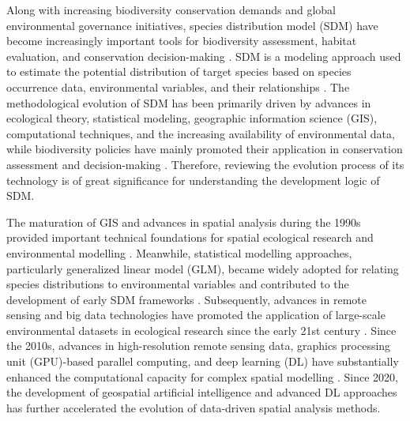 \documentclass[authoryear,preprint,review,12pt]{elsarticle}
\begin{document}
Along with increasing biodiversity conservation demands and global environmental governance initiatives, species distribution model (SDM) have become increasingly important tools for biodiversity assessment, habitat evaluation, and conservation decision-making \citep{elith2009species}. SDM is a modeling approach used to estimate the potential distribution of target species based on species occurrence data, environmental variables, and their relationships \citep{xu2015development,franklin2013species}. The methodological evolution of SDM has been primarily driven by advances in ecological theory, statistical modeling, geographic information science (GIS), computational techniques, and the increasing availability of environmental data, while biodiversity policies have mainly promoted their application in conservation assessment and decision-making \citep{austin2007species, guisan2005predicting}. Therefore, reviewing the evolution process of its technology is of great significance for understanding the development logic of SDM.

The maturation of GIS and advances in spatial analysis during the 1990s provided important technical foundations for spatial ecological research and environmental modelling \citep{goodchild1992geographical}. Meanwhile, statistical modelling approaches, particularly generalized linear model (GLM), became widely adopted for relating species distributions to environmental variables and contributed to the development of early SDM frameworks \citep{guisan2000predictive}. Subsequently, advances in remote sensing and big data technologies have promoted the application of large-scale environmental datasets in ecological research since the early 21st century \citep{chen2022remote}. Since the 2010s, advances in high-resolution remote sensing data, graphics processing unit (GPU)-based parallel computing, and deep learning (DL) have substantially enhanced the computational capacity for complex spatial modelling \citep{owens2008gpu,zhu2017deep}. Since 2020, the development of geospatial artificial intelligence and advanced DL approaches has further accelerated the evolution of data-driven spatial analysis methods\citep{janowicz2020geoai,reichstein2019deep}.
\end{document}
